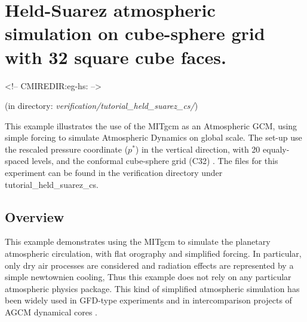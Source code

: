 
\section[Held-Suarez Atmosphere MITgcm Example]{Held-Suarez atmospheric simulation
on cube-sphere grid with 32 square cube faces.}
\label{sec:eg-hs}
\begin{rawhtml}
<!-- CMIREDIR:eg-hs: -->
\end{rawhtml}
\begin{center}
(in directory: {\it verification/tutorial\_held\_suarez\_cs/})
\end{center}


%
%

This example illustrates the use of the MITgcm as an Atmospheric GCM,
using simple \cite{held-suar:94} forcing 
to simulate Atmospheric Dynamics on global scale.
The set-up use the rescaled pressure coordinate ($p^*$)\cite[]{adcroft:04a}
in the vertical direction, with 20 equaly-spaced levels, and
the conformal cube-sphere grid (C32) \cite[]{adcroft:04b}.
The files for this experiment can be found in the verification directory
under tutorial\_held\_suarez\_cs.

\subsection{Overview}

This example demonstrates using the MITgcm to simulate
the planetary atmospheric circulation, with flat orography
and simplified forcing.
In particular, only dry air processes are considered and 
radiation effects are represented by a simple newtownien cooling,
Thus this example does not rely on any particular atmospheric 
physics package.
This kind of simplified atmospheric simulation has been widely 
used in GFD-type experiments and in intercomparison projects of 
AGCM dynamical cores \cite[]{held-suar:94}.

